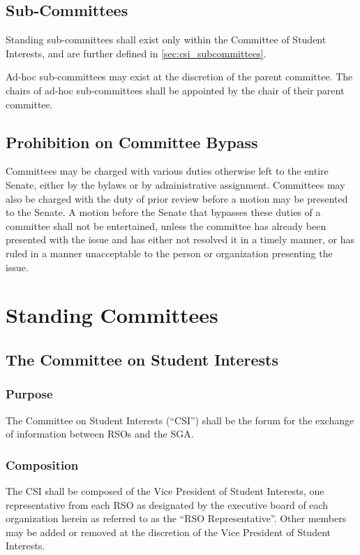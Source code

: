 \documentclass[12pt]{scrreprt}
\begin{document}
\section{Sub-Committees}
Standing sub-committees shall exist only within the Committee of Student 
Interests, and are further defined in \ref{sec:csi_subcommittees}.

Ad-hoc sub-committees may exist at the discretion of the parent committee. The 
chairs of ad-hoc sub-committees shall be appointed by the chair of their 
parent committee.

\section{Prohibition on Committee Bypass}
Committees may be charged with various duties otherwise left to the entire 
Senate, either by the bylaws or by administrative assignment. Committees may 
also be charged with the duty of prior review before a motion may be presented 
to the Senate. A motion before the Senate that bypasses these duties of a 
committee shall not be entertained, unless the committee has already been 
presented with the issue and has either not resolved it in a timely manner, or 
has ruled in a manner unacceptable to the person or organization presenting 
the issue.

\chapter{Standing Committees}

\section{The Committee on Student Interests} \label{sec:csi_representative}

\subsection{Purpose}
The Committee on Student Interests (``CSI'') shall be the forum for the 
exchange of information between RSOs and the SGA.

\subsection{Composition}
The CSI shall be composed of the Vice President of Student Interests, one representative from each RSO as designated by the executive board of each organization herein as referred to as the ``RSO Representative''. Other members may be added or removed at the discretion of the Vice President of Student Interests.
\end{document}
